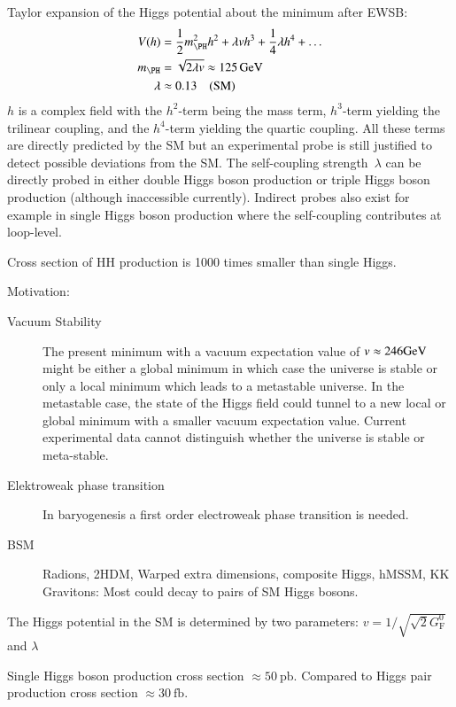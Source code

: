 Taylor expansion of the Higgs potential about the minimum after EWSB:
\begin{align*}
  V(h) &= \frac{1}{2} m_{\PH}^2 h^2 + \lambda v h^3 + \frac{1}{4} \lambda h^4 + \dots \\
  m_{\PH} &= \sqrt{2 \lambda v} \approx \SI{125}{\GeV} \\
  \lambda &\approx 0.13 \quad \text{(SM)}
\end{align*}
$h$ is a complex field with the $h^2$-term being the mass term,
$h^3$-term yielding the trilinear coupling, and the $h^4$-term
yielding the quartic coupling. All these terms are directly predicted
by the SM but an experimental probe is still justified to detect
possible deviations from the SM. The self-coupling strength~$\lambda$
can be directly probed in either double Higgs boson production or
triple Higgs boson production (although inaccessible
currently). Indirect probes also exist for example in single Higgs
boson production where the self-coupling contributes at loop-level.

Cross section of HH production is 1000 times smaller than single
Higgs. 

Motivation:
\begin{description}

\item[Vacuum Stability] The present minimum with a vacuum expectation
  value of $v \approx \si{246}{\ensuremath{\text{GeV}}}$ might be either a global minimum
  in which case the universe is stable or only a local minimum which
  leads to a metastable universe. In the metastable case, the state of
  the Higgs field could tunnel to a new local or global minimum with a
  smaller vacuum expectation value. Current experimental data cannot
  distinguish whether the universe is stable or
  meta-stable.

\item[Elektroweak phase transition] In baryogenesis a first order
  electroweak phase transition is needed.

\item[BSM] Radions, 2HDM, Warped extra dimensions, composite Higgs,
  hMSSM, KK Gravitons: Most could decay to pairs of SM Higgs bosons.

\end{description}

The Higgs potential in the SM is determined by two parameters:
$v = 1 / \sqrt{\sqrt{2} G_{\text{F}}^0}$ and $\lambda$

Single Higgs boson production cross section
$\approx \SI{50}{\pico\barn}$. Compared to Higgs pair production cross
section $\approx \SI{30}{\femto\barn}$.


